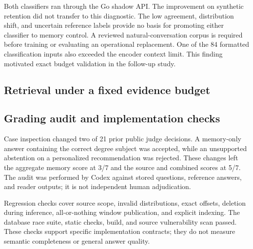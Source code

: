 Both classifiers ran through the Go shadow API. The improvement on synthetic retention did not transfer to this diagnostic. The low agreement, distribution shift, and uncertain reference labels provide no basis for promoting either classifier to memory control. A reviewed natural-conversation corpus is required before training or evaluating an operational replacement. One of the 84 formatted classification inputs also exceeded the encoder context limit. This finding motivated exact budget validation in the follow-up study.

\subsection{Retrieval under a fixed evidence budget}


\subsection{Grading audit and implementation checks}
Case inspection changed two of 21 prior public judge decisions. A memory-only answer containing the correct degree subject was accepted, while an unsupported abstention on a personalized recommendation was rejected. These changes left the aggregate memory score at 3/7 and the source and combined scores at 5/7. The audit was performed by Codex against stored questions, reference answers, and reader outputs; it is not independent human adjudication.

Regression checks cover source scope, invalid distributions, exact offsets, deletion during inference, all-or-nothing window publication, and explicit indexing. The database race suite, static checks, build, and source vulnerability scan passed. These checks support specific implementation contracts; they do not measure semantic completeness or general answer quality.
